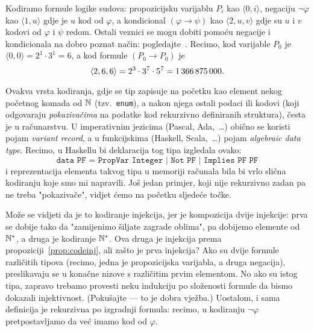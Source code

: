\begin{primjer}[{name=[primitivna rekurzivnost skupa svih formula logike sudova]}]\label{pr:lskod}
Kodiramo formule logike sudova: propozicijsku varijablu $P_i$ kao $\langle0,i\rangle$, negaciju $\lnot\varphi$ kao $\langle1,u\rangle$ gdje je $u$ kod od $\varphi$, a kondicional $(\varphi\to\psi)$ kao $\langle2,u,v\rangle$ gdje su $u$ i $v$ kodovi od $\varphi$ i $\psi$ redom. Ostali veznici se mogu dobiti pomoću negacije i kondicionala na dobro poznat način: pogledajte~\cite{skr:VukML}. Recimo, kod varijable $P_0$ je $\langle0,0\rangle=2^1\cdot3^1=6$, a kod formule $(P_0\to P_0)$ je \begin{equation}
    \langle2,6,6\rangle=2^3\cdot3^7\cdot5^7=1\,366\,875\,000\text.
\end{equation}

Ovakva vrsta kodiranja, gdje se tip zapisuje na početku kao element nekog početnog komada od ${\mathbb N}$ (tzv.\ \texttt{enum}), a nakon njega ostali podaci ili kodovi (koji odgovaraju \emph{pokazivačima} na podatke kod rekurzivno definiranih struktura), česta je u računarstvu. U imperativnim jezicima (Pascal, Ada,~\ldots) obično se koristi pojam \emph{variant record}, a u funkcijskima (Haskell, Scala,~\ldots) pojam \emph{algebraic data type}. Recimo, u Haskellu bi deklaracija tog tipa izgledala ovako:
\begin{equation}
\texttt{data PF = PropVar Integer | Not PF | Implies PF PF}
\end{equation}
i reprezentacija elementa takvog tipa u memoriji računala bila bi vrlo slična kodiranju koje smo mi napravili. Još jedan primjer, koji nije rekurzivno zadan pa ne treba "pokazivače", vidjet ćemo na početku sljedeće točke.

Može se vidjeti da je to kodiranje injekcija, jer je kompozicija dvije injekcije: prva se dobije tako da "zamijenimo šiljate zagrade oblima", pa dobijemo elemente od ${\mathbb N}^*$, a druga je kodiranje ${\mathbb N}^*$. Ova druga je injekcija prema propoziciji~\ref{prop:codeinj}, ali zašto je prva injekcija? Ako su dvije formule različitih tipova (recimo, jedna je propozicijska varijabla, a druga negacija), preslikavaju se u konačne nizove s različitim prvim elementom. No ako su istog tipa, zapravo trebamo provesti neku indukciju po složenosti formule da bismo dokazali injektivnost. (Pokušajte --- to je dobra vježba.) Uostalom, i sama definicija je rekurzivna po izgradnji formula: recimo, u kodiranju $\lnot\varphi$ pretpostavljamo da već imamo kod od $\varphi$.


\end{primjer}
